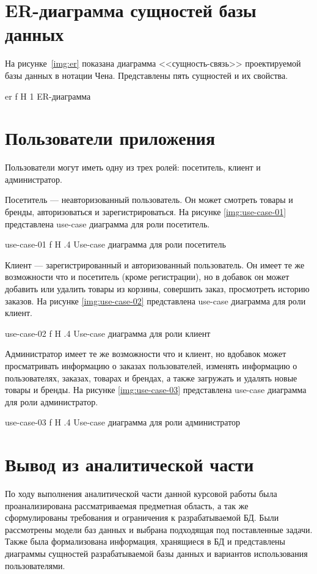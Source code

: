 \documentclass{bmstu}
\begin{document}
\pagebreak
\section{ER-диаграмма сущностей базы данных}

На рисунке~\ref{img:er} показана диаграмма <<сущность-связь>> проектируемой базы данных в нотации Чена. 
Представлены пять сущностей и их свойства.

    {er}
    {f}
    {H}
    {1\textwidth}
    {ER-диаграмма}
    
\section{Пользователи приложения}

Пользователи могут иметь одну из трех ролей: посетитель, клиент и администратор.

Посетитель --- неавторизованный пользователь. 
Он может смотреть товары и бренды, авторизоваться и зарегистрироваться. На рисунке \ref{img:use-case-01} представлена use-case диаграмма для роли посетитель.

{use-case-01}
{f}
{H}
{.4\textwidth}
{Use-case диаграмма для роли посетитель}

Клиент --- зарегистрированный и авторизованный пользователь. 
Он имеет те же возможности что и посетитель (кроме регистрации), но в добавок он может добавить или удалить товары из корзины, совершить заказ, просмотреть историю заказов. На рисунке \ref{img:use-case-02} представлена use-case диаграмма для роли клиент.

{use-case-02}
{f}
{H}
{.4\textwidth}
{Use-case диаграмма для роли клиент}

Администратор имеет те же возможности что и клиент, но вдобавок может просматривать информацию о заказах пользователей, изменять информацию о пользователях, заказах, товарах и брендах, а также загружать и удалять новые товары и бренды. На рисунке \ref{img:use-case-03} представлена use-case диаграмма для роли администратор.

{use-case-03}
{f}
{H}
{.4\textwidth}
{Use-case диаграмма для роли администратор}

\section*{Вывод из аналитической части}

По ходу выполнения аналитической части данной курсовой работы была проанализирована рассматриваемая предметная область, а так же сформулированы требования и ограничения к разрабатываемой БД. Были рассмотрены модели баз данных и выбрана подходящая под поставленные задачи. Также была формализована информация, хранящиеся в БД и представлены диаграммы сущностей разрабатываемой базы данных и вариантов использования пользователями.
\end{document}
